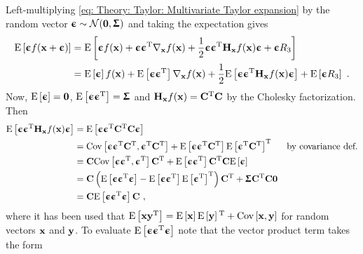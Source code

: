 Left-multiplying \eqref{eq: Theory: Taylor: Multivariate Taylor expansion} by the random vector $\epsilonb\sim\mathcal{N}(\0,\Sigmab)$ and taking the expectation gives
\begin{align}\label{eq: Taylor: Expected value on both sides before evaluation of terms}
    \text{E}\left[\epsilonb f(\x+\epsilonb)\right] &= \text{E}\left[\epsilonb f(\x) + \epsilonb\epsilonb\transpose\nabla_\x f(\x) + \frac{1}{2}\epsilonb\epsilonb\transpose\H_\x f(\x)\epsilonb + \epsilonb R_3\right]\nonumber\\
    &= \text{E}\left[\epsilonb\right] f(\x) + \text{E}\left [\epsilonb\epsilonb\transpose\right]\nabla_\x f(\x) +  \frac{1}{2}\text{E}\left[\epsilonb\epsilonb\transpose\H_\x f(\x)\epsilonb\right] + \text{E}\left[\epsilonb R_3\right] \ .
\end{align}
Now, $\text{E}\left[\epsilonb\right]=\0$, $\text{E}\left [\epsilonb\epsilonb\transpose\right]=\Sigmab$ and $\H_\x f(\x) = \C\transpose\C$ by the Cholesky factorization. Then
\begin{align*}
    \text{E}\left[\epsilonb\epsilonb\transpose\H_\x f(\x)\epsilonb\right]
    &= \text{E}\left[\epsilonb\epsilonb\transpose\C\transpose\C\epsilonb\right]\\
    &= \text{Cov}\left[\epsilonb\epsilonb\transpose\C\transpose, \epsilonb\transpose\C\transpose\right] + \text{E}\left[\epsilonb\epsilonb\transpose\C\transpose\right]\text{E}\left[\epsilonb\transpose\C\transpose\right]^\text{T} & \text{by covariance def.}\\
    &= \C\text{Cov}\left[\epsilonb\epsilonb\transpose,\epsilonb\transpose\right]\C\transpose + \text{E}\left[\epsilonb\epsilonb\transpose\right]\C\transpose\C\text{E}\left[\epsilonb\right]\\
    &= \C\left( \text{E}\left[\epsilonb\epsilonb\transpose\epsilonb\right] - \text{E}\left[\epsilonb\epsilonb\transpose\right]\text{E}\left[\epsilonb\transpose\right]^\text{T} \right)\C\transpose + \Sigmab\C\transpose\C\0\\
    &= \C\text{E}\left[\epsilonb\epsilonb\transpose\epsilonb\right]\C \ ,
\end{align*}
where it has been used that $\text{E}\left[\x\y\transpose\right]=\text{E}\left[\x\right]\text{E}\left[\y\right]\transpose + \text{Cov}\left[\x,\y\right]$ for random vectors $\x$ and $\y$. To evaluate $\text{E}\left[\epsilonb\epsilonb\transpose\epsilonb\right]$ note that the vector product term takes the form
